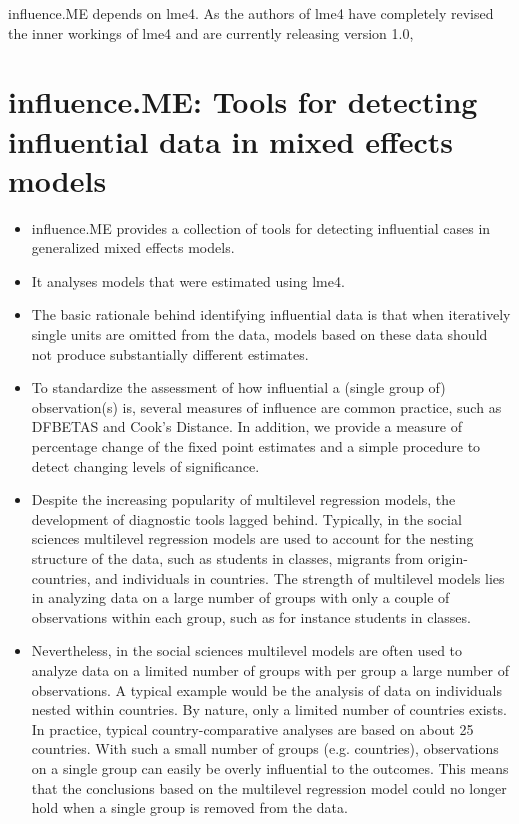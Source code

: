 \documentclass[12pt, a4paper]{article}
\begin{document}
influence.ME depends on lme4. As the authors of lme4 have completely revised the inner workings of lme4 and are currently releasing version 1.0, 

\section{influence.ME: Tools for detecting influential data in mixed effects models}
\begin{itemize}
	\item influence.ME provides a collection of tools for detecting influential cases in generalized mixed effects models. 
	\item It analyses models that were estimated using lme4. 
	\item The basic rationale behind identifying influential data is that when iteratively single units are omitted from the data, 
	models based on these data should not produce substantially different estimates. 
	\item To standardize the assessment of how influential a (single group of) observation(s) is, several measures of influence 
	are common practice, such as DFBETAS and Cook's Distance. In addition, we provide a measure of percentage change of the 
	fixed point estimates and a simple procedure to detect changing levels of significance.
	
	
	
	\item Despite the increasing popularity of multilevel regression models, the development of diagnostic tools lagged behind. Typically, in the social sciences multilevel regression models are used to account for the nesting structure of the data, such as students in classes, migrants from origin-countries, and individuals in countries. The strength of multilevel models lies in analyzing data on a large number of groups with only a couple of observations within each group, such as for instance students in classes.
	
	\item Nevertheless, in the social sciences multilevel models are often used to analyze data on a limited number of groups with per group a large number of observations. A typical example would be the analysis of data on individuals nested within countries. By nature, only a limited number of countries exists. In practice, typical country-comparative analyses are based on about 25 countries. With such a small number of groups (e.g. countries), observations on a single group can easily be overly influential to the outcomes. This means that the conclusions based on the multilevel regression model could no longer hold when a single group is removed from the data.
	

\end{itemize}
\end{document}
